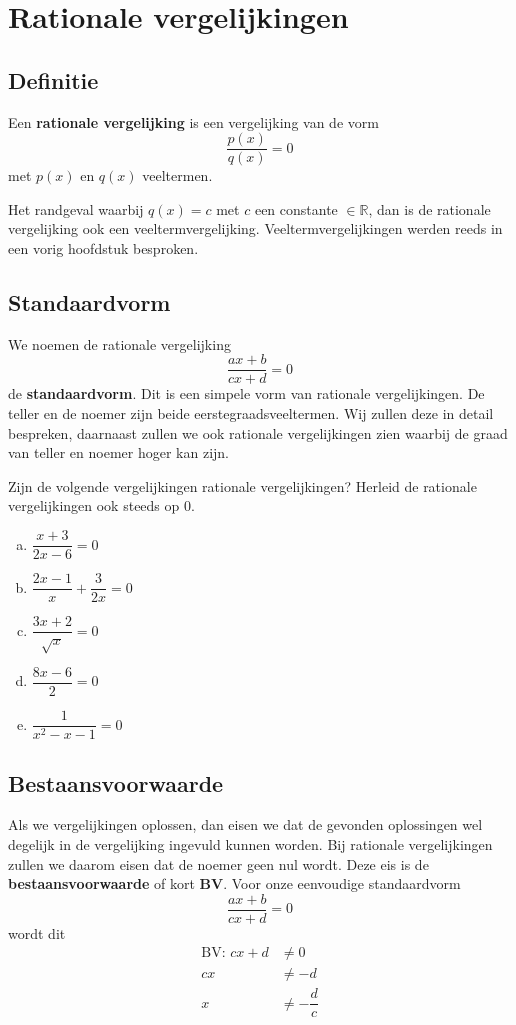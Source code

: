 \documentclass[12pt]{article}
\begin{document}
\pagebreak
\section{Rationale vergelijkingen}

\subsection{Definitie}
Een {\bf rationale vergelijking} is een vergelijking van de vorm
$$\dfrac{p(x)}{q(x)}=0$$
met $p(x)$ en $q(x)$ veeltermen.

Het randgeval waarbij $q(x)=c$ met $c$ een constante $\in \mathbb{R}$, dan is de rationale vergelijking ook een veeltermvergelijking. Veeltermvergelijkingen werden reeds in een vorig hoofdstuk besproken.

\subsection{Standaardvorm}
We noemen de rationale vergelijking
$$\dfrac{ax+b}{cx+d}=0$$
de {\bf standaardvorm}. Dit is een simpele vorm van rationale vergelijkingen. De teller en de noemer zijn beide eerstegraadsveeltermen. Wij zullen deze in detail bespreken, daarnaast zullen we ook rationale vergelijkingen zien waarbij de graad van teller en noemer hoger kan zijn.

\begin{oefening}
Zijn de volgende vergelijkingen rationale vergelijkingen? Herleid de rationale vergelijkingen ook steeds op 0.\\
\begin{enumerate}[(a)]
  \itemsep1em
  \item $\dfrac{x+3}{2x-6}=0$
  \item $\dfrac{2x-1}{x}+\dfrac{3}{2x}=0$
  \item $\dfrac{3x+2}{\sqrt{x}}=0$
  \item $\dfrac{8x-6}{2}=0$
  \item $\dfrac{1}{x^2-x-1}=0$
\end{enumerate}
\end{oefening}


\subsection{Bestaansvoorwaarde}
Als we vergelijkingen oplossen, dan eisen we dat de gevonden oplossingen wel degelijk in de vergelijking ingevuld kunnen worden. Bij rationale vergelijkingen zullen we daarom eisen dat de noemer geen nul wordt. Deze eis is de {\bf bestaansvoorwaarde} of kort {\bf BV}. Voor onze eenvoudige standaardvorm
$$\dfrac{ax+b}{cx+d}=0$$
wordt dit
\begin{align*}
  \mbox{BV: } cx+d &\neq 0\\
                cx &\neq -d\\
                 x &\neq -\dfrac{d}{c}
\end{align*}
\end{document}
